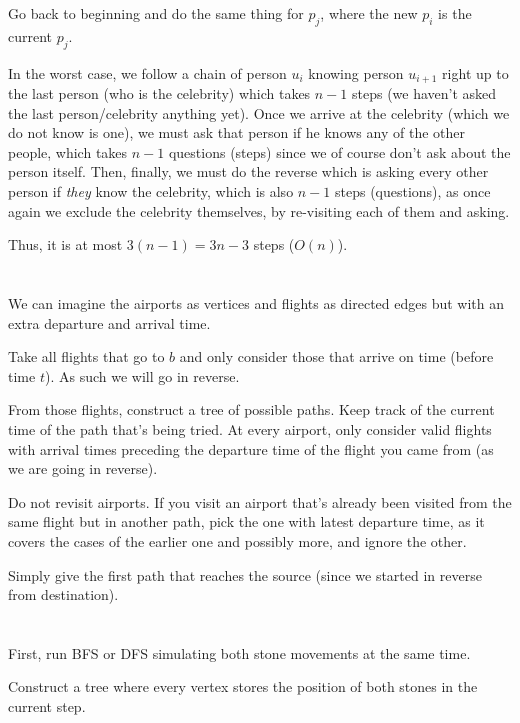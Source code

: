 \documentclass[11pt,letterpaper]{article}
\begin{document}
	Go back to beginning and do the same thing for $p_j$, where the new $p_i$ is the current $p_j$.\newline
	
	In the worst case, we follow a chain of person $u_i$ knowing person $u_{i+1}$ right up to the last person (who is the celebrity) which takes $n-1$ steps (we haven't asked the last person/celebrity anything yet).
	Once we arrive at the celebrity (which we do not know is one), we must ask that person if he knows any of the other people, which takes $n-1$ questions (steps) since we of course don't ask about the person itself.
	Then, finally, we must do the reverse which is asking every other person if \textit{they} know the celebrity, which is also $n-1$ steps (questions), as once again we exclude the celebrity themselves, by re-visiting each of them and asking.
	
	Thus, it is at most $3(n-1)=3n-3$ steps ($O(n)$).
	
	\section{}
	We can imagine the airports as vertices and flights as directed edges but with an extra departure and arrival time.
	
	Take all flights that go to $b$ and only consider those that arrive on time (before time $t$). As such we will go in reverse.
	
	From those flights, construct a tree of possible paths. Keep track of the current time of the path that's being tried.
	At every airport, only consider valid flights with arrival times preceding the departure time of the flight you came from (as we are going in reverse).
	
	Do not revisit airports. If you visit an airport that's already been visited from the same flight but in another path, pick the one with latest departure time, as it covers the cases of the earlier one and possibly more, and ignore the other.
	
	Simply give the first path that reaches the source (since we started in reverse from destination).
	
	\section{}
	First, run BFS or DFS simulating both stone movements at the same time.
	
	Construct a tree where every vertex stores the position of both stones in the current step.
	
\end{document}
